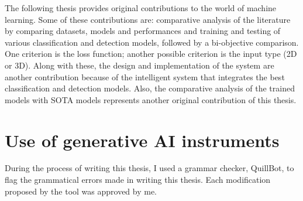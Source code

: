 The following thesis provides original contributions to the world of machine learning. Some of these contributions are: comparative analysis of the literature by comparing datasets, models and performances and training and testing of various classification and detection models, followed by a bi-objective comparison. One criterion is the loss function; another possible criterion is the input type (2D or 3D). Along with these, the design and implementation of the system are another contribution because of the intelligent system that integrates the best classification and detection models. Also, the comparative analysis of the trained models with SOTA models represents another original contribution of this thesis.

\section{Use of generative AI instruments}

During the process of writing this thesis, I used a grammar checker, QuillBot, to flag the grammatical errors made in writing this thesis. Each modification proposed by the tool was approved by me.